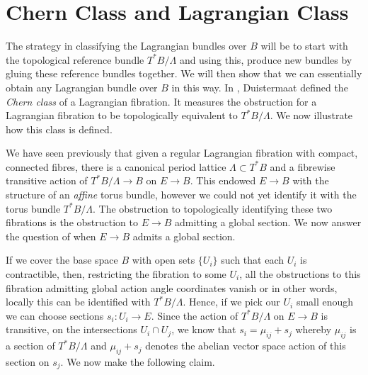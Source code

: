 \section{Chern Class and Lagrangian Class}
The strategy in classifying the Lagrangian bundles over $B$ will be to start
with the topological reference bundle $T^*B/\Lambda$ and using this, produce
new bundles by gluing these reference bundles together. We will then show that
we can essentially obtain any Lagrangian bundle over $B$ in this way. In
\cite{ActionAngle}, Duistermaat defined the \emph{Chern class} of a Lagrangian
fibration. It measures the obstruction for a Lagrangian fibration to be
topologically equivalent to $T^*B/\Lambda$. We now illustrate how this class is
defined.

We have seen previously that given a regular Lagrangian fibration with compact,
connected fibres, there is a canonical period lattice $\Lambda \subset T^*B$
and a fibrewise transitive action of $T^*B/\Lambda \to B$ on $E \to B$. This
endowed $E \to B$ with the structure of an \emph{affine} torus bundle, however
we could not yet identify it with the torus bundle $T^*B/\Lambda$. The
obstruction to topologically identifying these two fibrations is the
obstruction to $E \to B$ admitting a global section. We now answer the question
of when $E \to B$ admits a global section.

If we cover the base space $B$ with open sets $\{U_i\}$ such that each $U_i$ is
contractible, then, restricting the fibration to some $U_i$, all the
obstructions to this fibration admitting global action angle coordinates vanish
or in other words, locally this can be identified with $T^*B/\Lambda$. Hence,
if we pick our $U_i$ small enough we can choose sections $s_i: U_i \to E$.
Since the action of $T^*B/\Lambda$ on $E \to B$ is transitive, on the
intersections $U_i \cap U_j$, we know that $s_i = \mu_{ij} + s_j$ whereby
$\mu_{ij}$ is a section of $T^*B/\Lambda$ and $\mu_{ij} + s_j$ denotes the
abelian vector space action of this section on $s_j$. We now make the following
claim.

